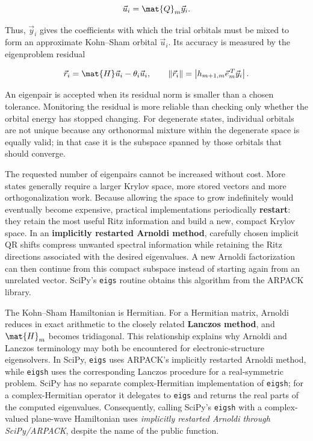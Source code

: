 \begin{equation}
    \vec{u}_{i}=\mat{Q}_{m}\vec{y}_{i}.
    \label{eq:ritz-vector}
\end{equation}

Thus, \(\vec{y}_{i}\) gives the coefficients with which the trial orbitals must be mixed to form an approximate Kohn--Sham orbital \(\vec{u}_{i}\). Its accuracy is measured by the eigenproblem residual

\begin{equation}
    \vec{r}_{i}=\mat{H}\vec{u}_{i}-\theta_{i}\vec{u}_{i},
    \qquad
    \|\vec{r}_{i}\|
    =\left|h_{m+1,m}\vec{e}_{m}^{\,T}\vec{y}_{i}\right|.
    \label{eq:ritz-residual}
\end{equation}

An eigenpair is accepted when its residual norm is smaller than a chosen tolerance. Monitoring the residual is more reliable than checking only whether the orbital energy has stopped changing. For degenerate states, individual orbitals are not unique because any orthonormal mixture within the degenerate space is equally valid; in that case it is the subspace spanned by those orbitals that should converge.

The requested number of eigenpairs cannot be increased without cost. More states generally require a larger Krylov space, more stored vectors and more orthogonalization work. Because allowing the space to grow indefinitely would eventually become expensive, practical implementations periodically \textbf{restart}: they retain the most useful Ritz information and build a new, compact Krylov space. In an \textbf{implicitly restarted Arnoldi method}, carefully chosen implicit QR shifts compress unwanted spectral information while retaining the Ritz directions associated with the desired eigenvalues. A new Arnoldi factorization can then continue from this compact subspace instead of starting again from an unrelated vector. SciPy's \texttt{eigs} routine obtains this algorithm from the ARPACK library.\cite{arnoldi_scipy}

The Kohn--Sham Hamiltonian is Hermitian. For a Hermitian matrix, Arnoldi reduces in exact arithmetic to the closely related \textbf{Lanczos method}, and \(\mat{H}_{m}\) becomes tridiagonal. This relationship explains why Arnoldi and Lanczos terminology may both be encountered for electronic-structure eigensolvers. In SciPy, \texttt{eigs} uses ARPACK's implicitly restarted Arnoldi method, while \texttt{eigsh} uses the corresponding Lanczos procedure for a real-symmetric problem. SciPy has no separate complex-Hermitian implementation of \texttt{eigsh}; for a complex-Hermitian operator it delegates to \texttt{eigs} and returns the real parts of the computed eigenvalues.\cite{arnoldi_scipy,lanczos_scipy} Consequently, calling SciPy's \texttt{eigsh} with a complex-valued plane-wave Hamiltonian uses \emph{implicitly restarted Arnoldi through SciPy/ARPACK}, despite the name of the public function.

